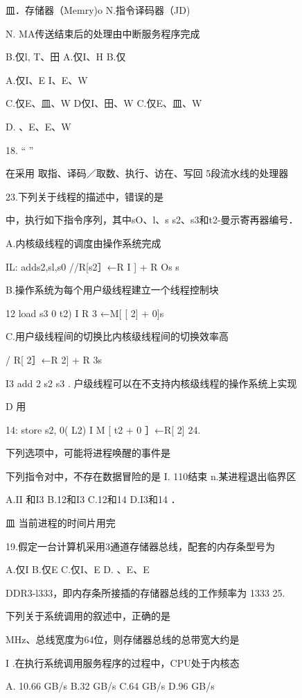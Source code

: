 {   皿．存储器（Memry)o    N.指令译码器（JD)

    N. MA传送结束后的处理由中断服务程序完成

    B.仅l, T、田    A.仅I、H    B.仅

   A.仅I、E    I、E、W

   C.仅E、皿、W    D仅I、田、W    C.仅E、皿、W

    D.  、E、E、W

18.    “    ”

   在采用 取指、译码／取数、执行、访在、写回 5段流水线的处理器

    23.下列关于线程的描述中，错误的是

   中，执行如下指令序列，其中sO、l、s  s2、s3和t2-曼示寄再器编号．

    A.内核级线程的调度由操作系统完成

   IL:   adds2,sl,s0     //R[s2］←R  I ] + R  Os     s

    B.操作系统为每个用户级线程建立一个线程控制块

   12    load s3  0  t2)     I  R  3 ←M[ [ 2] + 0]s

    C.用户级线程间的切换比内核级线程间的切换效率高

    /  R[ 2］←R  2] + R  3s

   I3    add 2  s2  s3    .   户级线程可以在不支持内核级线程的操作系统上实现

    D 用

   14:   store s2, 0( L2)     I  M [   t2  + 0 ］←R[ 2]    24.

    下列选项中，可能将进程唤醒的事件是

   下列指令对中，不存在数据冒险的是    I. 110结束    n.某进程退出临界区

   A.II 和I3    B.12和I3    C.12和14    D.I3和14    ．

    皿 当前进程的时间片用完

19.假定一台计算机采用3通道存储器总线，配套的内存条型号为

    A.仅I    B.仅E    C.仅I、E    D. 、E、E

   DDR3-l333，即内存条所接插的存储器总线的工作频率为 1333    25.

    下列关于系统调用的叙述中，正确的是

   MHz、总线宽度为64位，则存储器总线的总带宽大约是

    I .在执行系统调用服务程序的过程中，CPU处于内核态

   A. 10.66 GB/s    B.32 GB/s    C.64 GB/s    D.96 GB/s

}
